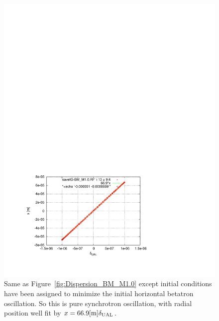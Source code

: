 \documentclass[]{article}
\begin{document}
\begin{figure}[h]
\begin{minipage}[b]{\linewidth}
\centering
\includegraphics[scale=0.7]{pdf/Dispersion_BM_M1p0p2.pdf}
\caption{\label{fig:Dispersion_BM_M1.0.2}Same as 
Figure~\ref{fig:Dispersion_BM_M1.0} except initial conditions have
been assigned to minimize the initial horizontal betatron oscillation.
So this is pure synchrotron oscillation, with radial
position well fit by $x=66.9[{\rm m}]\delta_{\rm UAL}$.
}
\end{minipage}
\end{figure}
%

\clearpage
\end{document}

